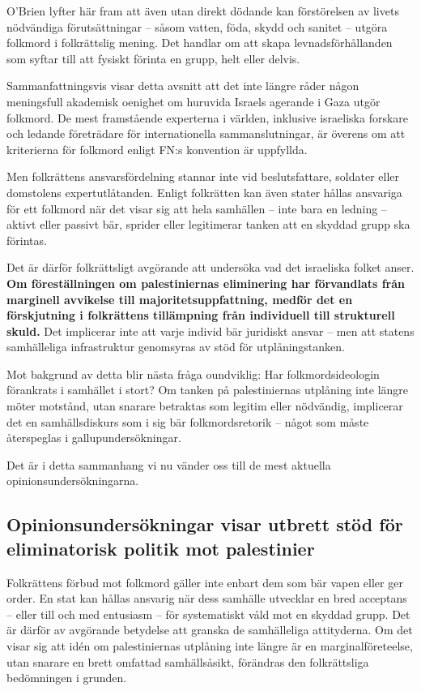 O’Brien lyfter här fram att även utan direkt dödande kan förstörelsen av livets nödvändiga förutsättningar – såsom vatten, föda, skydd och sanitet – utgöra folkmord i folkrättslig mening. Det handlar om att skapa levnadsförhållanden som syftar till att fysiskt förinta en grupp, helt eller delvis.

Sammanfattningsvis visar detta avsnitt att det inte längre råder någon meningsfull akademisk oenighet om huruvida Israels agerande i Gaza utgör folkmord. De mest framstående experterna i världen, inklusive israeliska forskare och ledande företrädare för internationella sammanslutningar, är överens om att kriterierna för folkmord enligt FN:s konvention är uppfyllda.

Men folkrättens ansvarsfördelning stannar inte vid beslutsfattare, soldater eller domstolens expertutlåtanden. Enligt folkrätten kan även stater hållas ansvariga för ett folkmord när det visar sig att hela samhällen – inte bara en ledning – aktivt eller passivt bär, sprider eller legitimerar tanken att en skyddad grupp ska förintas.


Det är därför folkrättsligt avgörande att undersöka vad det israeliska folket anser. 
\textbf{Om föreställningen om palestiniernas eliminering har förvandlats från marginell avvikelse till majoritetsuppfattning, medför det en förskjutning i folkrättens tillämpning från individuell till strukturell skuld.} 
Det implicerar inte att varje individ bär juridiskt ansvar – men att statens samhälleliga infrastruktur genomsyras av stöd för utplåningstanken.


Mot bakgrund av detta blir nästa fråga oundviklig: Har folkmordsideologin förankrats i samhället i stort? Om tanken på palestiniernas utplåning inte längre möter motstånd, utan snarare betraktas som legitim eller nödvändig, implicerar det en samhällsdiskurs som i sig bär folkmordsretorik – något som måste återspeglas i gallupundersökningar.


Det är i detta sammanhang vi nu vänder oss till de mest aktuella opinionsundersökningarna.


\subsection{Opinionsundersökningar visar utbrett stöd för eliminatorisk politik mot palestinier}

Folkrättens förbud mot folkmord gäller inte enbart dem som bär vapen eller ger order. En stat kan hållas ansvarig när dess samhälle utvecklar en bred acceptans – eller till och med entusiasm – för systematiskt våld mot en skyddad grupp. Det är därför av avgörande betydelse att granska de samhälleliga attityderna. Om det visar sig att idén om palestiniernas utplåning inte längre är en marginalföreteelse, utan snarare en brett omfattad samhällsåsikt, förändras den folkrättsliga bedömningen i grunden.

